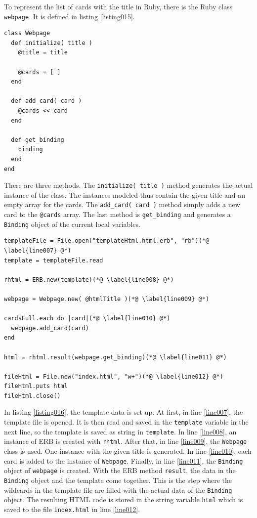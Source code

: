 To represent the list of cards with the title in Ruby, there is the Ruby class \texttt{webpage}. It is defined in listing \ref{listing015}.

\begin{lstlisting}[aboveskip=1\baselineskip, caption=Generating HTML without a templating engine., label=listing015]
class Webpage
  def initialize( title )
    @title = title

    @cards = [ ]
  end

  def add_card( card )
    @cards << card
  end

  def get_binding
    binding
  end
end
\end{lstlisting}

There are three methods. The \lstinline{initialize( title )} method generates the actual instance of the class. The instances modeled thus contain the given title and an empty array for the cards. The \lstinline{add_card( card )} method simply adds a new card to the \lstinline{@cards} array. The last method is \lstinline{get_binding} and generates a \lstinline{Binding} object of the current local variables.

\begin{lstlisting}[aboveskip=1\baselineskip, caption=Generating HTML with ERB., label=listing016]
templateFile = File.open("templateHtml.html.erb", "rb")(*@ \label{line007} @*)
template = templateFile.read

rhtml = ERB.new(template)(*@ \label{line008} @*)

webpage = Webpage.new( @htmlTitle )(*@ \label{line009} @*)

cardsFull.each do |card|(*@ \label{line010} @*)
  webpage.add_card(card)
end

html = rhtml.result(webpage.get_binding)(*@ \label{line011} @*)

fileHtml = File.new("index.html", "w+")(*@ \label{line012} @*)
fileHtml.puts html
fileHtml.close()
\end{lstlisting}

In listing \ref{listing016}, the template data is set up. At first, in line \ref{line007}, the template file is opened. It is then read and saved in the \lstinline{template} variable in the next line, so the template is saved as string in \lstinline{template}. In line \ref{line008}, an instance of ERB is created with \lstinline{rhtml}. After that, in line \ref{line009}, the \lstinline{Webpage} class is used. One instance with the given title is generated. In line \ref{line010}, each card is added to the instance of \lstinline{Webpage}. Finally, in line \ref{line011}, the \lstinline{Binding} object of \lstinline{webpage} is created. With the ERB method \lstinline{result}, the data in the \lstinline{Binding} object and the template come together. This is the step where the wildcards in the template file are filled with the actual data of the \lstinline{Binding} object. The resulting HTML code is stored in the string variable \lstinline{html} which is saved to the file \texttt{index.html} in line \ref{line012}. 



